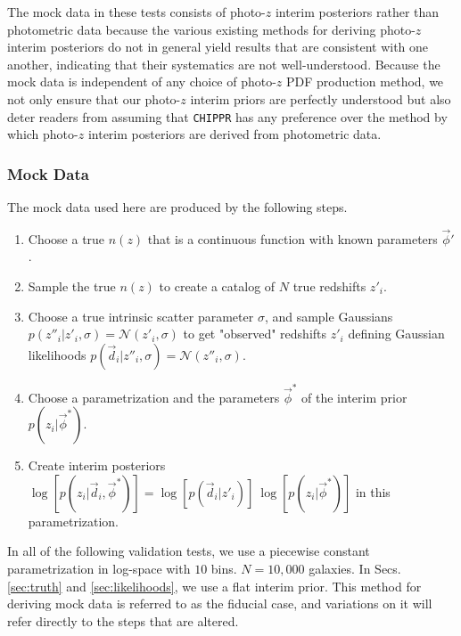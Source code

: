 \documentclass[iop]{emulateapj}
\newcommand{\chippr}{\texttt{CHIPPR} }
\begin{document}
The mock data in these tests consists of photo-$z$ interim posteriors rather than photometric data because the various existing methods for deriving photo-$z$ interim posteriors do not in general yield results that are consistent with one another, indicating that their systematics are not well-understood.  Because the mock data is independent of any choice of photo-$z$ PDF production method, we not only ensure that our photo-$z$ interim priors are perfectly understood but also deter readers from assuming that \chippr has any preference over the method by which photo-$z$ interim posteriors are derived from photometric data.

\subsubsection{Mock Data}
\label{sec:mockdata}

The mock data used here are produced by the following steps.

\begin{enumerate}
	\item \label{itm:true} Choose a true $n(z)$ that is a continuous function with known parameters $\vec{\phi}'$.
	\item \label{itm:sample} Sample the true $n(z)$ to create a catalog of $N$ true redshifts $z'_{i}$.
	\item \label{itm:scatter} Choose a true intrinsic scatter parameter $\sigma$, and sample Gaussians $p(z''_{i} | z'_{i}, \sigma) = \mathcal{N}(z'_{i}, \sigma)$ to get "observed" redshifts $z'_{i}$ defining Gaussian likelihoods $p(\vec{d}_{i} | z''_{i}, \sigma) = \mathcal{N}(z''_{i}, \sigma)$.
	\item \label{itm:interim} Choose a parametrization and the parameters $\vec{\phi}^{*}$ of the interim prior $p(z_{i} | \vec{\phi}^{*})$.
	\item \label{itm:posterior} Create interim posteriors $\log[p(z_{i} | \vec{d}_{i}, \vec{\phi}^{*})] = \log[p(\vec{d}_{i} | z'_{i})]\ \log[p(z_{i} | \vec{\phi}^{*})]$ in this parametrization.
\end{enumerate}

In all of the following validation tests, we use a piecewise constant parametrization in log-space with $10$ bins.  $N = 10,000$ galaxies.  In Secs. \ref{sec:truth} and \ref{sec:likelihoods}, we use a flat interim prior.  This method for deriving mock data is referred to as the fiducial case, and variations on it will refer directly to the steps that are altered.
\end{document}
